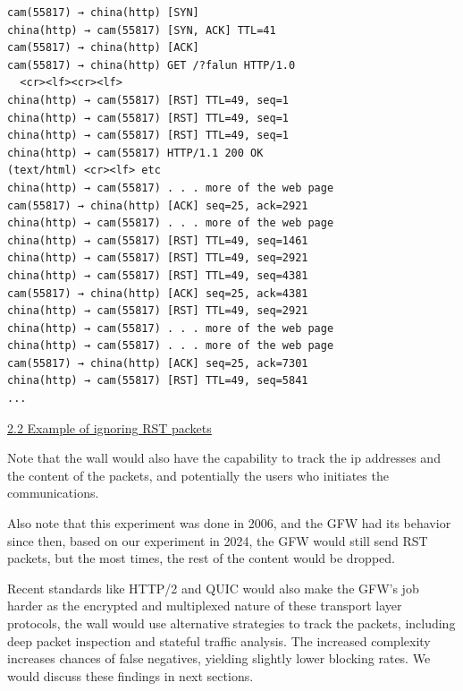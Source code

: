 \documentclass[nonacm,sigplan,screen]{acmart}
\begin{document}
\begin{verbatim}
cam(55817) → china(http) [SYN]
china(http) → cam(55817) [SYN, ACK] TTL=41
cam(55817) → china(http) [ACK]
cam(55817) → china(http) GET /?falun HTTP/1.0
  <cr><lf><cr><lf>
china(http) → cam(55817) [RST] TTL=49, seq=1
china(http) → cam(55817) [RST] TTL=49, seq=1
china(http) → cam(55817) [RST] TTL=49, seq=1
china(http) → cam(55817) HTTP/1.1 200 OK 
(text/html) <cr><lf> etc
china(http) → cam(55817) . . . more of the web page
cam(55817) → china(http) [ACK] seq=25, ack=2921
china(http) → cam(55817) . . . more of the web page
china(http) → cam(55817) [RST] TTL=49, seq=1461
china(http) → cam(55817) [RST] TTL=49, seq=2921
china(http) → cam(55817) [RST] TTL=49, seq=4381
cam(55817) → china(http) [ACK] seq=25, ack=4381
china(http) → cam(55817) [RST] TTL=49, seq=2921
china(http) → cam(55817) . . . more of the web page
china(http) → cam(55817) . . . more of the web page
cam(55817) → china(http) [ACK] seq=25, ack=7301
china(http) → cam(55817) [RST] TTL=49, seq=5841
...
\end{verbatim}
\href{}{2.2 Example of ignoring RST packets}

Note that the wall would also have the capability to track the ip
addresses and the content of the packets, and potentially the users who
initiates the communications.

Also note that this experiment was done in 2006, and the GFW had its
behavior since then, based on our experiment in 2024, the GFW would
still send RST packets, but the most times, the rest of the content
would be dropped.

Recent standards like HTTP/2 and QUIC would also make the GFW's job
harder as the encrypted and multiplexed nature of these transport layer
protocols, the wall would use alternative strategies to track the
packets, including deep packet inspection and stateful traffic analysis.
The increased complexity increases chances of false negatives, yielding
slightly lower blocking rates. We would discuss these findings in next
sections.


\end{document}
